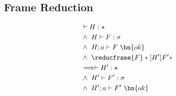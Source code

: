 \subsection{Frame Reduction}
\begin{theorem}
    \begin{alignat}{3}
    & \vdash H : \star \label{pres-prem-1}\\
    &\wedge\ H \vdash F : \sigma \label{pres-prem-2}\\
    &\wedge\ H; a \vdash F\ \bn{ok}\\
    &\wedge\ \reducframe{F}*[H']{F'}*\\
    &\Longrightarrow \vdash H' : \star\\
    &\wedge\ H' \vdash F' : \sigma\\
    &\wedge\ H'; a \vdash F'\ \bn{ok}
    \end{alignat}
\end{theorem}
